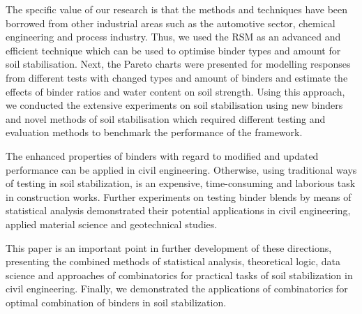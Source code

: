 \documentclass[eprint,
]{actapoly}
\begin{document}
The specific value of our research is that the methods and techniques have been borrowed from other industrial areas such as the automotive sector, chemical engineering and process industry. Thus, we used the RSM as an advanced and efficient technique which can be used to optimise binder types and amount for soil stabilisation. Next, the Pareto charts were presented for modelling responses from different tests with changed types and amount of binders and estimate the effects of binder ratios and water content on soil strength. Using this approach, we conducted the extensive experiments on soil stabilisation using new binders and novel methods of soil stabilisation which required different testing and evaluation methods to benchmark the performance of the framework. 

The enhanced properties of binders with regard to modified and updated performance can be applied in civil engineering. Otherwise, using traditional ways of testing in soil stabilization, is an expensive, time-consuming and laborious task in construction works. Further experiments on testing binder blends by means of statistical analysis demonstrated their potential applications in civil engineering, applied material science and geotechnical studies. 

This paper is an important point in further development of these directions, presenting the combined methods of statistical analysis, theoretical logic, data science and approaches of combinatorics for practical tasks of soil stabilization in civil engineering. Finally, we demonstrated the applications of combinatorics for optimal combination of binders in soil stabilization.
\end{document}
